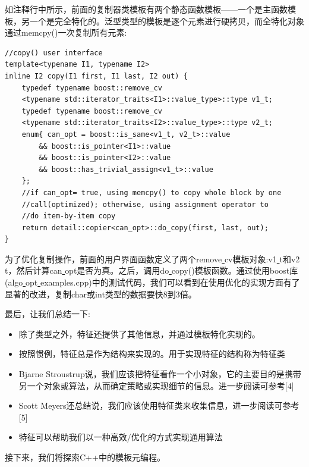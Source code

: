 如注释行中所示，前面的复制器类模板有两个静态函数模板——一个是主函数模板，另一个是完全特化的。泛型类型的模板是逐个元素进行硬拷贝，而全特化对象通过memcpy()一次复制所有元素: \par

\begin{lstlisting}[caption={}]
//copy() user interface
template<typename I1, typename I2>
inline I2 copy(I1 first, I1 last, I2 out) {
	typedef typename boost::remove_cv
	<typename std::iterator_traits<I1>::value_type>::type v1_t;
	typedef typename boost::remove_cv
	<typename std::iterator_traits<I2>::value_type>::type v2_t;
	enum{ can_opt = boost::is_same<v1_t, v2_t>::value
		&& boost::is_pointer<I1>::value
		&& boost::is_pointer<I2>::value
		&& boost::has_trivial_assign<v1_t>::value
	};
	//if can_opt= true, using memcpy() to copy whole block by one
	//call(optimized); otherwise, using assignment operator to
	//do item-by-item copy
	return detail::copier<can_opt>::do_copy(first, last, out);
}
\end{lstlisting}

为了优化复制操作，前面的用户界面函数定义了两个remove\underline{ }cv模板对象:v1\underline{ }t和v2\underline{ }t，然后计算can\underline{ }opt是否为真。之后，调用do\underline{ }copy()模板函数。通过使用boost库(algo\underline{ }opt\underline{ }examples.cpp)中的测试代码，我们可以看到在使用优化的实现方面有了显著的改进，复制char或int类型的数据要快8到3倍。 \par
最后，让我们总结一下: \par

\begin{itemize}
	\item 除了类型之外，特征还提供了其他信息，并通过模板特化实现的。
	\item 按照惯例，特征总是作为结构来实现的。用于实现特征的结构称为特征类
	\item Bjarne Stroustrup说，我们应该把特征看作一个小对象，它的主要目的是携带另一个对象或算法，从而确定策略或实现细节的信息。进一步阅读可参考[4]
	\item Scott Meyers还总结说，我们应该使用特征类来收集信息，进一步阅读可参考[5]
	\item 特征可以帮助我们以一种高效/优化的方式实现通用算法
\end{itemize}

接下来，我们将探索C++中的模板元编程。 \par

